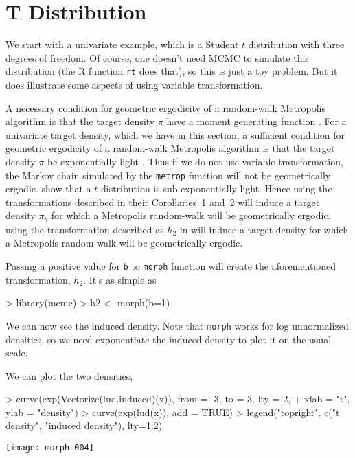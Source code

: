 \documentclass{article}
\begin{document}
\section{T Distribution} \label{sec:toy}

We start with a univariate example, which is a Student $t$ distribution
with three degrees of freedom.
Of course, one doesn't need MCMC to simulate this distribution
(the R function \texttt{rt} does that), so this is just a toy problem.
But it does illustrate some aspects of using variable transformation.

A necessary condition for geometric ergodicity of a random-walk Metropolis
algorithm is that the target density $\pi$ have a moment generating function
\citep{jarner-tweedie}.
For a univariate target density, which we have in this section,
a sufficient condition for geometric ergodicity of a random-walk Metropolis
algorithm is that the target density $\pi$ be exponentially light
\citet{mengersen-tweedie}.
Thus if we do not use variable transformation,
the Markov chain simulated by the \texttt{metrop} function will not
be geometrically ergodic.
\citet[Example 4.2]{johnson-geyer} show that a $t$ distribution is
sub-exponentially light.  Hence using the transformations
described in their Corollaries~1 and~2 will induce a target density
$\pi_\gamma$ for which a Metropolis random-walk will be geometrically
ergodic.
using the transformation described as $h_2$ in
\citet[Corollary~2]{johnson-geyer} will induce a target density for which a
Metropolis random-walk will be geometrically ergodic.

Passing a positive value for \texttt{b} to \texttt{morph} function will
create the aforementioned transformation, $h_2$.  It's as simple as
\begin{Schunk}
\begin{Sinput}
> library(mcmc)
> h2 <- morph(b=1)
\end{Sinput}
\end{Schunk}
We can now see the induced density.  Note that \texttt{morph} works for
log unnormalized densities, so we need exponentiate the induced density to
plot it on the usual scale.
\begin{Schunk}
\end{Schunk}
We can plot the two densities,
\begin{Schunk}
\begin{Sinput}
> curve(exp(Vectorize(lud.induced)(x)), from = -3, to = 3, lty = 2,
+     xlab = "t", ylab = "density")
> curve(exp(lud(x)), add = TRUE)
> legend("topright", c("t density", "induced density"), lty=1:2)
\end{Sinput}
\end{Schunk}
\texttt{[image: morph-004]}
\end{document}
